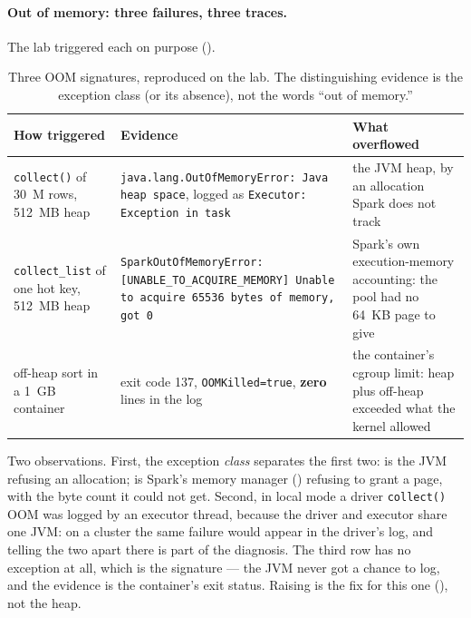 \paragraph{Out of memory: three failures, three traces.} The lab triggered each on
purpose ().

\begin{table}[htbp]
\centering\footnotesize
\renewcommand{\arraystretch}{1.25}
\begin{tabular}{@{}P{3.0cm}P{5.0cm}P{5.8cm}@{}}
\toprule
\textbf{How triggered} & \textbf{Evidence} & \textbf{What overflowed} \\
\midrule
\texttt{collect()} of 30~M rows, 512~MB heap & \texttt{java.lang.OutOfMemoryError: Java heap space}, logged as \texttt{Executor: Exception in task} & the JVM heap, by an allocation Spark does not track \\
\texttt{collect\_list} of one hot key, 512~MB heap & \texttt{SparkOutOfMemoryError: [UNABLE\_TO\_ACQUIRE\_MEMORY] Unable to acquire 65536 bytes of memory, got 0} & Spark's own execution-memory accounting: the pool had no 64~KB page to give \\
off-heap sort in a 1~GB container & exit code 137, \texttt{OOMKilled=true}, \textbf{zero}  lines in the log & the container's cgroup limit: heap plus off-heap exceeded what the kernel allowed \\
\bottomrule
\end{tabular}
\caption{Three OOM signatures, reproduced on the lab. The distinguishing evidence is
the exception class (or its absence), not the words ``out of memory.''}
\label{tab:debug-oom}
\end{table}

Two observations. First, the exception \emph{class} separates the first two:
 is the JVM refusing an allocation;
 is Spark's memory manager ()
refusing to grant a page, with the byte count it could not get. Second, in local
mode a driver \texttt{collect()} OOM was logged by an executor thread, because the
driver and executor share one JVM: on a cluster the same failure would appear in the
driver's log, and telling the two apart there is part of the diagnosis. The third
row has no exception at all, which is the signature --- the JVM never got a chance
to log, and the evidence is the container's exit status. Raising
 is the fix for this one
(), not the heap.

